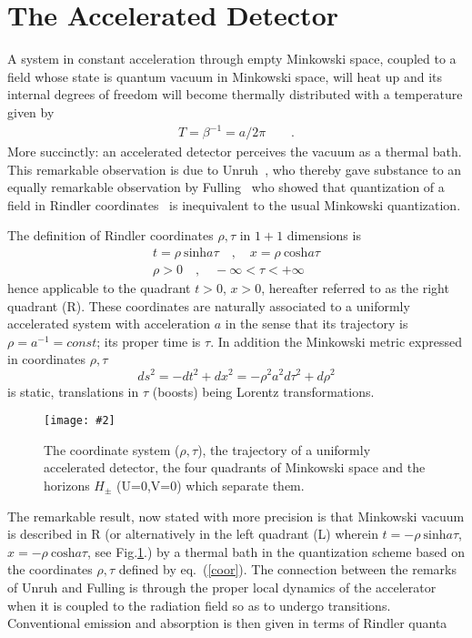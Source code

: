 \documentclass[12pt,oneside]{report}
\newcommand{\dessin}[4]
{\begin{figure}[tp]\begin{center}
\texttt{[image: \#2]}%
\end{center}
\caption{#4}
\label{#3}
\end{figure}}
\begin{document}
\section{The Accelerated Detector}\label{general}
A system in constant acceleration through empty Minkowski space, coupled 
to a field whose state is quantum vacuum in Minkowski
space, will heat up and its internal degrees of freedom will become thermally
distributed with a temperature given by
\begin{eqnarray}
T = \beta^{-1} = a/2\pi \qquad .\label{temp}
\end{eqnarray}
More succinctly: an accelerated detector perceives the vacuum
as a thermal bath.  This remarkable observation is due to Unruh~\cite{Unru1},
who thereby gave substance to an equally remarkable observation by
Fulling~\cite{Full} who showed that 
quantization of a field in Rindler coordinates~\cite{Rind} 
is inequivalent to the usual
Minkowski quantization. 

The
definition of Rindler coordinates $\rho, \tau$ in $1+1$ dimensions is
\begin{eqnarray}
t=\rho\ \mbox{sinh} a \tau\quad , \quad
x=\rho\ \mbox{cosh} a \tau \nonumber\\
\rho > 0 \quad , \quad - \infty < \tau < +\infty
\label{coor}\end{eqnarray}
hence applicable to the quadrant $t>0$, $x>0$, hereafter referred to as the
right quadrant (R). 
These coordinates are naturally associated to a uniformly  accelerated system
with  acceleration $a$ in the sense that its trajectory is 
$\rho =a^{-1}= const $; its proper time is $\tau$. In addition the
Minkowski metric expressed in coordinates $\rho, \tau$ 
\begin{equation}
ds^2=-dt^2+dx^2=-\rho^2 a^2 d\tau^2 + d \rho^2
\label{coor2}\end{equation}
is static, translations in $\tau$ (boosts) being Lorentz
transformations.

\dessin{1.000}{NFIG2-1.eps}{Mink}{The coordinate system ($\rho,\tau$), the trajectory of a
uniformly accelerated detector, the four quadrants of Minkowski space 
and the horizons $H_\pm$ (U=0,V=0) which separate them.} 
The
remarkable result, now stated with more precision is that Minkowski vacuum is
described in R (or alternatively in the left quadrant (L) wherein $t= - \rho\ 
\mbox{sinh} a \tau$, $ x=-\rho\ \mbox{cosh} a \tau$, see Fig.\ref{Mink}.) by a
thermal bath in the quantization scheme based on the coordinates $\rho,\tau$
defined by eq.~(\ref{coor}). The connection between the remarks of Unruh and
Fulling is through the proper local dynamics of the accelerator when it is
coupled to the radiation field so as to undergo transitions. Conventional
emission and absorption is then given in terms of Rindler quanta 
\end{document}

